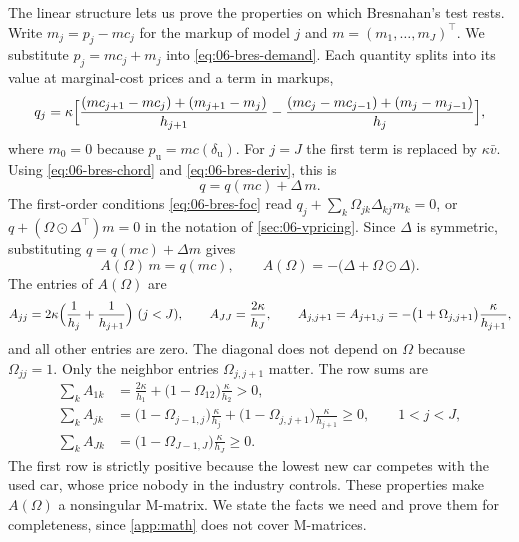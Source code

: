 The linear structure lets us prove the properties on which Bresnahan's test rests. Write $m_j = p_j - mc_j$ for the
markup of model $j$ and $m = (m_1,\dots,m_J)^\top$. We substitute $p_j = mc_j + m_j$ into \eqref{eq:06-bres-demand}.
Each quantity splits into its value at marginal-cost prices and a term in markups,
\begin{equation*}
  q_j = \kappa\Bigl[\frac{(mc_{j+1} - mc_j) + (m_{j+1} - m_j)}{h_{j+1}}
        - \frac{(mc_j - mc_{j-1}) + (m_j - m_{j-1})}{h_j}\Bigr],
\end{equation*}
where $m_0 = 0$ because $p_{\mathrm u} = mc(\delta_{\mathrm u})$. For $j = J$ the first term is replaced by
$\kappa\bar v$. Using \eqref{eq:06-bres-chord} and \eqref{eq:06-bres-deriv}, this is
\begin{equation*}
  q = q(mc) + \Delta\,m .
\end{equation*}
The first-order conditions \eqref{eq:06-bres-foc} read $q_j + \sum_k \Omega_{jk}\Delta_{kj}m_k = 0$, or
$q + (\Omega\odot \Delta^\top)m = 0$ in the notation of \cref{sec:06-vpricing}. Since $\Delta$ is symmetric, substituting
$q = q(mc) + \Delta m$ gives
\begin{equation}\label{eq:06-bres-linear}
  A(\Omega)\,m = q(mc),
  \qquad
  A(\Omega) = -\bigl(\Delta + \Omega\odot \Delta\bigr).
\end{equation}
The entries of $A(\Omega)$ are
\begin{equation}\label{eq:06-bres-Amat}
  A_{jj} = 2\kappa\Bigl(\frac{1}{h_j} + \frac{1}{h_{j+1}}\Bigr)\ (j < J),
  \qquad A_{JJ} = \frac{2\kappa}{h_J},
  \qquad A_{j,j+1} = A_{j+1,j} = -\bigl(1 + \Omega_{j,j+1}\bigr)\frac{\kappa}{h_{j+1}},
\end{equation}
and all other entries are zero. The diagonal does not depend on $\Omega$ because $\Omega_{jj} = 1$. Only the
neighbor entries $\Omega_{j,j+1}$ matter. The row sums are
\begin{equation}\label{eq:06-bres-rowsums}
\begin{aligned}
  \textstyle\sum_k A_{1k} &= \frac{2\kappa}{h_1} + \bigl(1 - \Omega_{12}\bigr)\frac{\kappa}{h_2} > 0,\\
  \textstyle\sum_k A_{jk} &= \bigl(1 - \Omega_{j-1,j}\bigr)\frac{\kappa}{h_j} + \bigl(1 - \Omega_{j,j+1}\bigr)\frac{\kappa}{h_{j+1}} \ge 0,
  \qquad 1 < j < J,\\
  \textstyle\sum_k A_{Jk} &= \bigl(1 - \Omega_{J-1,J}\bigr)\frac{\kappa}{h_J} \ge 0 .
\end{aligned}
\end{equation}
The first row is strictly positive because the lowest new car competes with the used car, whose price nobody in the
industry controls. These properties make $A(\Omega)$ a nonsingular M-matrix. We state the facts we need and prove
them for completeness, since \cref{app:math} does not cover M-matrices.

